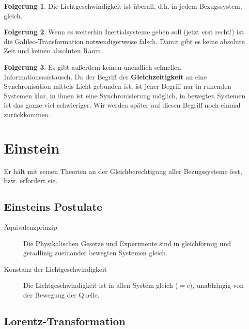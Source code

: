 \documentclass[oneside]{book}
\theoremstyle{definition}
\newtheorem*{folgerung*}{Folgerung}
\begin{document}
\begin{folgerung*}
	Die Lichtgeschwindigkeit ist überall, d.h. in jedem Bezugssystem, gleich.
\end{folgerung*}
\begin{folgerung*}
	Wenn es weiterhin Inertialsysteme geben soll (jetzt erst recht!) ist die Galileo-Transformation notwendigerweise falsch. Damit gibt es keine absolute Zeit und keinen absoluten Raum.
\end{folgerung*}
\begin{folgerung*}
	Es gibt außerdem keinen unendlich schnellen Informationsaustausch. Da der Begriff der \textbf{Gleichzeitigkeit} an eine Synchronisation mittels Licht gebunden ist, ist jener Begriff nur in ruhenden Systemen klar, in ihnen ist eine Synchronisierung möglich, in bewegten Systemen ist das ganze viel schwieriger. Wir werden später auf diesen Begriff noch einmal zurückkommen.
\end{folgerung*}

\section{Einstein}
Er hält mit seinen Theorien an der Gleichberechtigung aller Bezugssysteme fest, bzw. erfordert sie.

\subsection{Einsteins Postulate}
\begin{description}
	\item[Äquivalenzprinzip] Die Physikalischen Gesetze und Experimente sind in gleichförmig und geradlinig zueinander bewegten Systemen gleich.
	\item[Konstanz der Lichtgeschwindigkeit] Die Lichtgeschwindigkeit ist in allen System gleich ($=c$), unabhängig von der Bewegung der Quelle. 
\end{description}

\subsection{Lorentz-Transformation}
\end{document}
